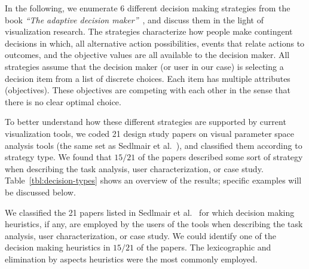 In the following, we enumerate 6 different decision making strategies from the book \emph{``The adaptive decision
maker''}~\citep{Payne:1993}, and discuss them in the light of visualization research.
The strategies characterize how people make contingent decisions in which, all alternative
action possibilities, events that relate actions to outcomes, and the objective
values are all available to the decision maker.
All strategies assume that the decision maker (or user in our case)
is selecting a decision item from a list of discrete choices. Each item
has multiple attributes (objectives). These objectives are competing with
each other in the sense that there is no clear optimal choice. 


To better understand how these different strategies are supported by current visualization tools,
we coded 21 design study papers on visual parameter space analysis tools
(the same set as Sedlmair et al.~\citep{Sedlmair:2014}), and classified them according to strategy 
type. We found that $15/21$ of the papers described
some sort of strategy when describing the task analysis, user
characterization, or case study. Table~\ref{tbl:decision-types} shows an overview of the results;
specific examples will be discussed below.

\begin{table}[tb]
  \begin{center}
    \caption{We classified the 21 papers listed in 
             Sedlmair et al.~\citep{Sedlmair:2014} for which decision making
             heuristics, if any, are employed by the users of the tools
             when describing the task analysis, user characterization,
             or case study.  We could identify one of the decision making 
             heuristics in $15/21$ of the papers. The lexicographic and 
             elimination by aspects heuristics were the most commonly
             employed.
    }
    \label{tbl:decision-types}
  \end{center}
\end{table}



